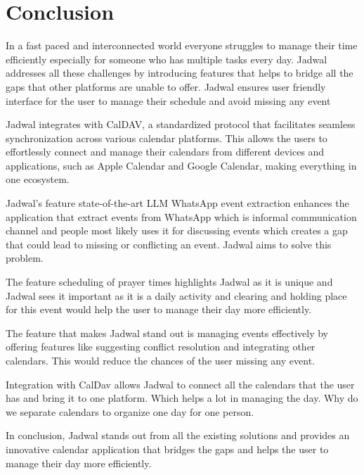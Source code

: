 \documentclass[12pt,a4paper]{report}
\begin{document}
\chapter*{Conclusion}

In a fast paced and interconnected world everyone struggles to manage their time efficiently especially for someone who has multiple tasks every day. Jadwal addresses all these challenges by introducing features that helps to bridge all the gaps that other platforms are unable to offer. Jadwal ensures user friendly interface for the user to manage their schedule and avoid missing any event

Jadwal integrates with CalDAV, a standardized protocol that facilitates seamless synchronization across various calendar platforms. This allows the users to effortlessly connect and manage their calendars from different devices and applications, such as Apple Calendar and Google Calendar, making everything in one ecosystem.

Jadwal's feature state-of-the-art LLM WhatsApp event extraction enhances the application that extract events from WhatsApp which is informal communication channel and people most likely uses it for discussing events which creates a gap that could lead to missing or conflicting an event. Jadwal aims to solve this problem.

The feature scheduling of prayer times highlights Jadwal as it is unique and Jadwal sees it important as it is a daily activity and clearing and holding place for this event would help the user to manage their day more efficiently.

The feature that makes Jadwal stand out is managing events effectively by offering features like suggesting conflict resolution and integrating other calendars. This would reduce the chances of the user missing any event.

Integration with CalDav allows Jadwal to connect all the calendars that the user has and bring it to one platform. Which helps a lot in managing the day. Why do we separate calendars to organize one day for one person.

In conclusion, Jadwal stands out from all the existing solutions and provides an innovative calendar application that bridges the gaps and helps the user to manage their day more efficiently.




\end{document}
